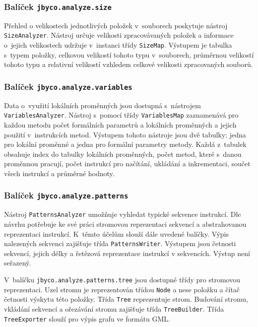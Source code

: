 \subsubsection{Balíček \texttt{jbyco.analyze.size}}

Přehled o velikostech jednotlivých položek v~souborech poskytuje nástroj \texttt{SizeAnalyzer}. Nástroj určuje velikosti zpracovávaných položek a informace o~jejich velikostech udržuje v~instanci třídy \texttt{SizeMap}. Výstupem je tabulka s~typem položky, celkovou velikostí tohoto typu v~souborech, průměrnou velikostí tohoto typu a relativní velikostí vzhledem celkové velikosti zpracovaných souborů. 

\subsubsection{Balíček \texttt{jbyco.analyze.variables}}

Data o~využití lokálních proměnných jsou dostupná s~nástrojem \texttt{VariablesAnalyzer}. Nástroj s~pomocí třídy \texttt{VariablesMap} zaznamenává pro každou metodu počet formálních parametrů a lokálních proměnných a jejich použití v~instrukcích metod. Výstupem tohoto nástroje jsou dvě tabulky: jedna pro lokální proměnné a jedna pro formální parametry metody. Každá z~tabulek obsahuje index do tabulky lokálních proměnných, počet metod, které s~danou proměnnou pracují, počet instrukcí pro načítání, ukládání a inkrementaci, součet všech instrukcí a průměrné hodnoty.

\subsubsection{Balíček \texttt{jbyco.analyze.patterns}}

Nástroj \texttt{PatternsAnalyzer} umožňuje vyhledat typické sekvence instrukcí. Dle návrhu potřebuje ke své práci stromovou reprezentaci sekvencí a abstrahovanou reprezentaci instrukcí. K~těmto účelům slouží dále uvedené balíčky. Výpis nalezených sekvenci zajišťuje třída \texttt{PatternsWriter}. Výstupem jsou četnosti sekvencí, jejich délky a řetězová reprezentace instrukcí v sekvencích. Výstup není seřazený.

V~balíčku \texttt{jbyco.analyze.patterns.tree} jsou dostupné třídy pro stromovou reprezentaci. Uzel stromu je reprezentován třídou \texttt{Node} a nese položku a čítač četnosti výskytu této položky. Třída \texttt{Tree} reprezentuje strom. Budování stromu, vkládání sekvencí a ořezávání stromu zajišťuje třída \texttt{TreeBuilder}. Třída \texttt{TreeExporter} slouží pro výpis grafu ve formátu GML.

